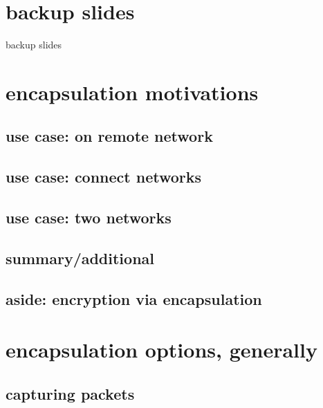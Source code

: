 \section{backup slides}
\begin{frame}{backup slides}
\end{frame}



\section{encapsulation motivations}
\subsection{use case: on remote network}

\subsection{use case: connect networks}


\subsection{use case: two networks}



\subsection{summary/additional}


\subsection{aside: encryption via encapsulation}




\section{encapsulation options, generally}


\subsection{capturing packets}


